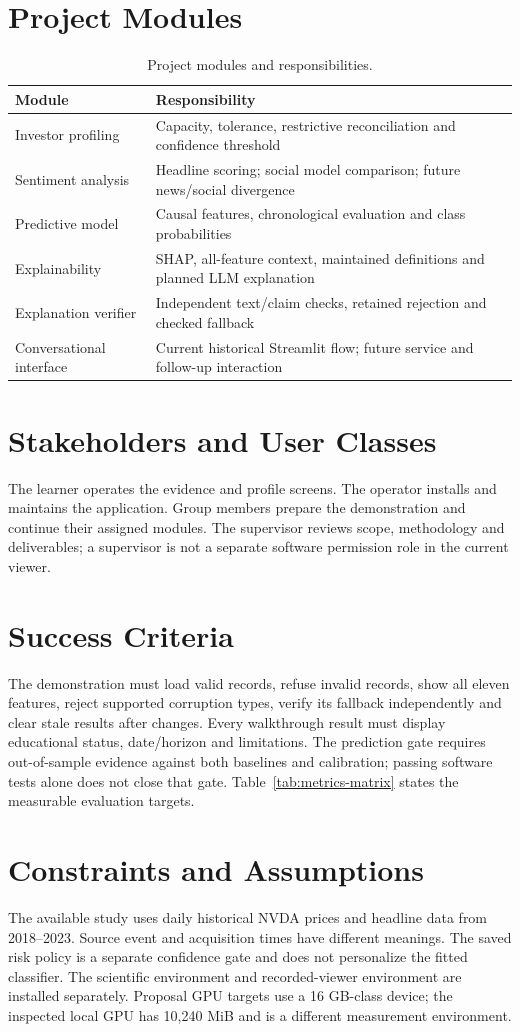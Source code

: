 \section{Project Modules}
\begin{longtable}{p{}p{}}
\caption{Project modules and responsibilities.}\label{tab:modules}\\\toprule Module & Responsibility\\\midrule
Investor profiling & Capacity, tolerance, restrictive reconciliation and confidence threshold\\
Sentiment analysis & Headline scoring; social model comparison; future news/social divergence\\
Predictive model & Causal features, chronological evaluation and class probabilities\\
Explainability & SHAP, all-feature context, maintained definitions and planned LLM explanation\\
Explanation verifier & Independent text/claim checks, retained rejection and checked fallback\\
Conversational interface & Current historical Streamlit flow; future service and follow-up interaction\\
\bottomrule\end{longtable}
\section{Stakeholders and User Classes}
The learner operates the evidence and profile screens. The operator installs and maintains the application. Group members prepare the demonstration and continue their assigned modules. The supervisor reviews scope, methodology and deliverables; a supervisor is not a separate software permission role in the current viewer.
\section{Success Criteria}
The demonstration must load valid records, refuse invalid records, show all eleven features, reject supported corruption types, verify its fallback independently and clear stale results after changes. Every walkthrough result must display educational status, date/horizon and limitations. The prediction gate requires out-of-sample evidence against both baselines and calibration; passing software tests alone does not close that gate. Table~\ref{tab:metrics-matrix} states the measurable evaluation targets.
\section{Constraints and Assumptions}
The available study uses daily historical NVDA prices and headline data from 2018--2023. Source event and acquisition times have different meanings. The saved risk policy is a separate confidence gate and does not personalize the fitted classifier. The scientific environment and recorded-viewer environment are installed separately. Proposal GPU targets use a 16 GB-class device; the inspected local GPU has 10,240 MiB and is a different measurement environment.
